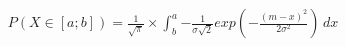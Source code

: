 \documentclass[preview]{standalone}
\begin{document}
\begin{align*}
P( X \in [a;b] ) = { \frac{1}{\sqrt{\pi}} } \times \int_b^a { { - \frac{1}{\sigma \sqrt{2}} } exp(-{ \frac{(m - x)^2}{2 \sigma^2} }) } \, dx
\end{align*}
\end{document}
